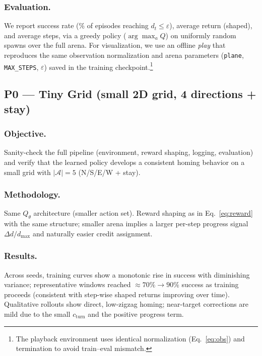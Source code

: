         \subsubsection{Evaluation.}
            We report success rate ($\%$ of episodes reaching $d_t\le\varepsilon$), average return (shaped), and average steps, via a greedy policy ($\arg\max_a Q$) on uniformly random spawns over the full arena. For visualization, we use an offline \emph{play} that reproduces the same observation normalization and arena parameters (\texttt{plane}, \texttt{MAX\_STEPS}, $\varepsilon$) saved in the training checkpoint.\footnote{The playback environment uses identical normalization (Eq.~\eqref{eq:obs}) and termination to avoid train–eval mismatch.}

    \subsection{P0 — Tiny Grid (small 2D grid, 4 directions + stay)}
        \subsubsection{Objective.}
            Sanity-check the full pipeline (environment, reward shaping, logging, evaluation) and verify that the learned policy develops a consistent homing behavior on a small grid with $|\mathcal{A}|=5$ (N/S/E/W + stay).
        
        \subsubsection{Methodology.}
            Same $Q_\theta$ architecture (smaller action set). Reward shaping as in Eq.~\eqref{eq:reward} with the same structure; smaller arena implies a larger per-step progress signal $\Delta d/d_{\max}$ and naturally easier credit assignment.
        
        \subsubsection{Results.}
            Across seeds, training curves show a monotonic rise in success with diminishing variance; representative windows reached $\approx 70\%\!\to\!90\%$ success as training proceeds (consistent with step-wise shaped returns improving over time). Qualitative rollouts show direct, low-zigzag homing; near-target corrections are mild due to the small $c_{\mathrm{turn}}$ and the positive progress term.
        
